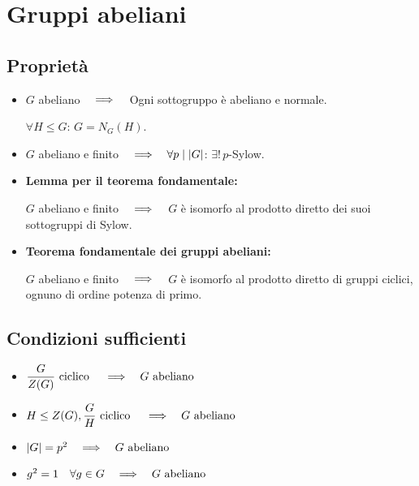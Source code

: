 \chapter{Gruppi abeliani}
\label{ch:gruppi_abeliani}

\section{Proprietà}
\label{sec:gruppi_abeliani_proprieta}

\begin{itemize}
    \item $G$ abeliano $\quad\Longrightarrow\quad$ Ogni sottogruppo è abeliano e normale.

        $\forall H \le G$: $G = N_G(H)$.
    \item $G$ abeliano e finito $\quad\Longrightarrow\quad \forall p \mid \lvert G \rvert$: $\exists ! \, p$-Sylow.
    \item \textbf{Lemma per il teorema fondamentale:}

        $G$ abeliano e finito $\quad\Longrightarrow\quad$ $G$ è isomorfo al prodotto diretto dei suoi sottogruppi di Sylow.
    \item \textbf{Teorema fondamentale dei gruppi abeliani:}

        $G$ abeliano e finito $\quad\Longrightarrow\quad$ $G$ è isomorfo al prodotto diretto di gruppi ciclici, ognuno di ordine potenza di primo.
\end{itemize}

\section{Condizioni sufficienti}
\label{sec:gruppi_abeliani_condizioni_sufficienti}

\begin{itemize}
    \item $\dfrac{G}{Z(G)} \text{ ciclico } \quad\Longrightarrow\quad G \text{ abeliano }$
    \item $H \le Z(G), \dfrac{G}{H} \text{ ciclico } \quad\Longrightarrow\quad G \text{ abeliano }$
    \item $\lvert G \rvert = p^2 \quad\Longrightarrow\quad G \text{ abeliano }$
    \item $g^2 = 1 \quad \forall g \in G \quad\Longrightarrow\quad G \text{ abeliano }$
\end{itemize}